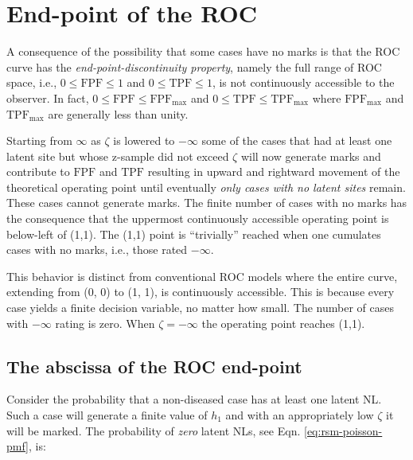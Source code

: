\documentclass[
]{book}
\begin{document}
\hypertarget{rsm-predictions-end-point}{%
\section{End-point of the ROC}\label{rsm-predictions-end-point}}

A consequence of the possibility that some cases have no marks is that the ROC curve has the \emph{end-point-discontinuity property}, namely the full range of ROC space, i.e., \(0 \leq \text{FPF} \leq 1\) and \(0 \leq \text{TPF} \leq 1\), is not continuously accessible to the observer. In fact, \(0 \leq \text{FPF} \leq \text{FPF}_{\text{max}}\) and \(0 \leq \text{TPF} \leq \text{TPF}_{\text{max}}\) where \(\text{FPF}_{\text{max}}\) and \(\text{TPF}_{\text{max}}\) are generally less than unity.

Starting from \(\infty\) as \(\zeta\) is lowered to \(-\infty\) some of the cases that had at least one latent site but whose z-sample did not exceed \(\zeta\) will now generate marks and contribute to \(\text{FPF}\) and \(\text{TPF}\) resulting in upward and rightward movement of the theoretical operating point until eventually \emph{only cases with no latent sites} remain. These cases cannot generate marks. The finite number of cases with no marks has the consequence that the uppermost continuously accessible operating point is below-left of (1,1). The (1,1) point is ``trivially'' reached when one cumulates cases with no marks, i.e., those rated \(-\infty\).

This behavior is distinct from conventional ROC models where the entire curve, extending from (0, 0) to (1, 1), is continuously accessible. This is because every case yields a finite decision variable, no matter how small. The number of cases with \(-\infty\) rating is zero. When \(\zeta = -\infty\) the operating point reaches (1,1).

\hypertarget{rsm-predictions-constrained-end-point-abscissa}{%
\subsection{The abscissa of the ROC end-point}\label{rsm-predictions-constrained-end-point-abscissa}}

Consider the probability that a non-diseased case has at least one latent NL. Such a case will generate a finite value of \(h_1\) and with an appropriately low \(\zeta\) it will be marked. The probability of \emph{zero} latent NLs, see Eqn. \eqref{eq:rsm-poisson-pmf}, is:
\end{document}
